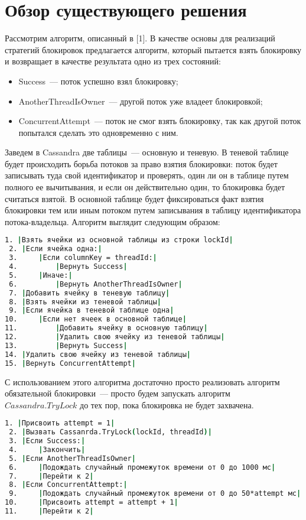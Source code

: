 \section{Обзор существующего решения}

Рассмотрим алгоритм, описанный в [1].
В качестве основы для реализаций стратегий блокировок предлагается алгоритм, который пытается взять блокировку и возвращает в качестве результата одно из трех состояний:

\begin{itemize}
	\item Success~--- поток успешно взял блокировку;
	\item AnotherThreadIsOwner~--- другой поток уже владеет блокировкой;
	\item ConcurrentAttempt~--- поток не смог взять блокировку, так как другой поток попытался сделать это одновременно с ним.
\end{itemize}

Заведем в Cassandra две таблицы~--- основную и теневую. В теневой таблице будет происходить борьба потоков за право взятия блокировки: поток будет записывать туда свой идентификатор и проверять, один ли он в таблице путем полного ее вычитывания, и если он действительно один, то блокировка будет считаться взятой. В основной таблице будет фиксироваться факт взятия блокировки тем или иным потоком путем записывания в таблицу идентификатора потока-владельца.
Алгоритм выглядит следующим образом:

\begin{lstlisting}[language=csh,caption={Алгоритм Cassandra.TryLock(lockId, threadId)}]
 1. |Взять ячейки из основной таблицы из строки lockId|
 2. |Если ячейка одна:|
 3. 	|Если columnKey = threadId:|
 4. 		|Вернуть Success|
 5. 	|Иначе:|
 6. 		|Вернуть AnotherThreadIsOwner|
 7. |Добавить ячейку в теневую таблицу|
 8. |Взять ячейки из теневой таблицы|
 9. |Если ячейка в теневой таблице одна|
10. 	|Если нет ячеек в основной таблице|
11. 		|Добавить ячейку в основную таблицу|
12. 		|Удалить свою ячейку из теневой таблицы|
13. 		|Вернуть Success|
14. |Удалить свою ячейку из теневой таблицы|
15. |Вернуть ConcurrentAttempt|
\end{lstlisting}

С использованием этого алгоритма достаточно просто реализовать алгоритм обязательной блокировки~--- просто будем запускать алгоритм\\ $Cassandra.TryLock$ до тех пор, пока блокировка не будет захвачена.

\begin{lstlisting}[language=csh,caption={Алгоритм Cassandra.GetLock(lockId, threadId)}]
 1. |Присвоить attempt = 1|
 2. |Вызвать Cassanrda.TryLock(lockId, threadId)|
 3. |Если Success:|
 4. 	|Закончить|
 5. |Если AnotherThreadIsOwner|
 6. 	|Подождать случайный промежуток времени от 0 до 1000 мс|
 7. 	|Перейти к 2|
 8. |Если ConcurrentAttempt:|
 9. 	|Подождать случайный промежуток времени от 0 до 50*attempt мс|
10. 	|Присвоить attempt = attempt + 1|
11. 	|Перейти к 2|
\end{lstlisting}

